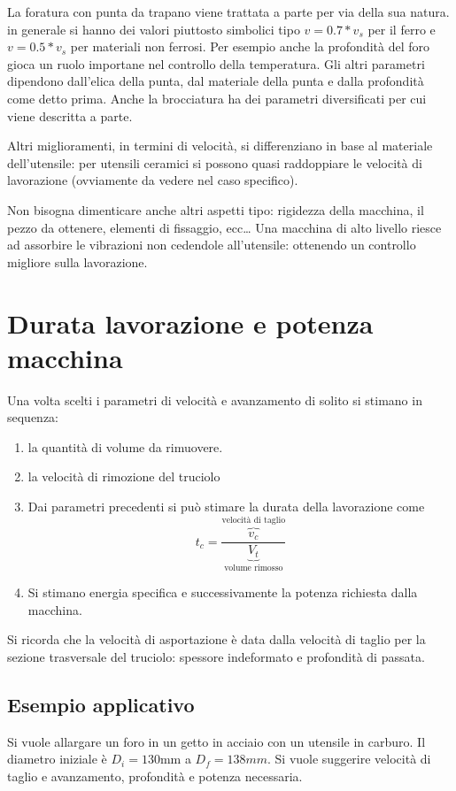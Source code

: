 La foratura con punta da trapano viene trattata a parte per via della sua natura. in generale si hanno dei valori piuttosto simbolici tipo $v = 0.7*v_s$ per il ferro e $v = 0.5*v_s$ per materiali non ferrosi.
Per esempio anche la profondità del foro gioca un ruolo importane nel controllo della temperatura.
Gli altri parametri dipendono dall'elica della punta, dal materiale della punta e dalla profondità come detto prima.
Anche la brocciatura ha dei parametri diversificati per cui viene descritta a parte.

Altri miglioramenti, in termini di velocità, si differenziano in base al materiale dell'utensile: per utensili ceramici si possono quasi raddoppiare le velocità di lavorazione (ovviamente da vedere nel caso specifico).

Non bisogna dimenticare anche altri aspetti tipo: rigidezza della macchina, il pezzo da ottenere, elementi di fissaggio, ecc\dots
Una macchina di alto livello riesce ad assorbire le vibrazioni non cedendole all'utensile: ottenendo un controllo migliore sulla lavorazione.

\section{Durata lavorazione e potenza macchina}
Una volta scelti i parametri di velocità e avanzamento di solito si stimano in sequenza:
\begin{enumerate}
\item la quantità di volume da rimuovere.
\item la velocità di rimozione del truciolo
\item Dai parametri precedenti si può stimare la durata della lavorazione come 
\begin{equation}
t_c = \frac{\overbrace{v_c}^{\text{velocità di taglio}}}{\underbrace{V_t}_{\text{volume rimosso}}}
\end{equation}
\item Si stimano energia specifica e successivamente la potenza richiesta dalla macchina.
\end{enumerate}

Si ricorda che la velocità di asportazione è data dalla velocità di taglio per la sezione trasversale del truciolo: spessore indeformato e profondità di passata.

\subsection{Esempio applicativo}
Si vuole allargare un foro in un getto in acciaio con un utensile in carburo. Il diametro iniziale è $D_i = 130\unit{\mm}$ a $D_f = 138\unit{mm}$. Si vuole suggerire velocità di taglio e avanzamento, profondità e potenza necessaria.

